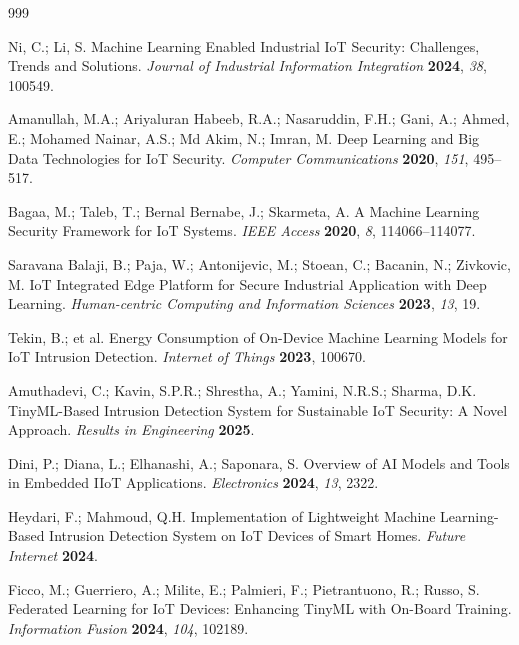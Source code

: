 \documentclass[journal,article,submit,moreauthors]{Definitions/mdpi}
\begin{document}

\isAPAandChicago{}
{
\begin{thebibliography}{999}

Ni, C.; Li, S. Machine Learning Enabled Industrial IoT Security: Challenges, Trends and Solutions. \emph{Journal of Industrial Information Integration} \textbf{2024}, \emph{38}, 100549.

Amanullah, M.A.; Ariyaluran Habeeb, R.A.; Nasaruddin, F.H.; Gani, A.; Ahmed, E.; Mohamed Nainar, A.S.; Md Akim, N.; Imran, M. Deep Learning and Big Data Technologies for IoT Security. \emph{Computer Communications} \textbf{2020}, \emph{151}, 495--517.

Bagaa, M.; Taleb, T.; Bernal Bernabe, J.; Skarmeta, A. A Machine Learning Security Framework for IoT Systems. \emph{IEEE Access} \textbf{2020}, \emph{8}, 114066--114077.

Saravana Balaji, B.; Paja, W.; Antonijevic, M.; Stoean, C.; Bacanin, N.; Zivkovic, M. IoT Integrated Edge Platform for Secure Industrial Application with Deep Learning. \emph{Human-centric Computing and Information Sciences} \textbf{2023}, \emph{13}, 19.

Tekin, B.; et al.
Energy Consumption of On-Device Machine Learning Models for IoT Intrusion Detection. \emph{Internet of Things} \textbf{2023}, 100670.

Amuthadevi, C.; Kavin, S.P.R.; Shrestha, A.; Yamini, N.R.S.; Sharma, D.K. TinyML-Based Intrusion Detection System for Sustainable IoT Security: A Novel Approach. \emph{Results in Engineering}
\textbf{2025}.

Dini, P.; Diana, L.; Elhanashi, A.; Saponara, S. Overview of AI Models and Tools in Embedded IIoT Applications. \emph{Electronics} \textbf{2024}, \emph{13}, 2322.

Heydari, F.; Mahmoud, Q.H. Implementation of Lightweight Machine Learning-Based Intrusion Detection System on IoT Devices of Smart Homes. \emph{Future Internet} \textbf{2024}.

Ficco, M.; Guerriero, A.; Milite, E.; Palmieri, F.; Pietrantuono, R.; Russo, S. Federated Learning for IoT Devices: Enhancing TinyML with On-Board Training. \emph{Information Fusion} \textbf{2024}, \emph{104}, 102189.


\end{thebibliography}}
\end{document}
